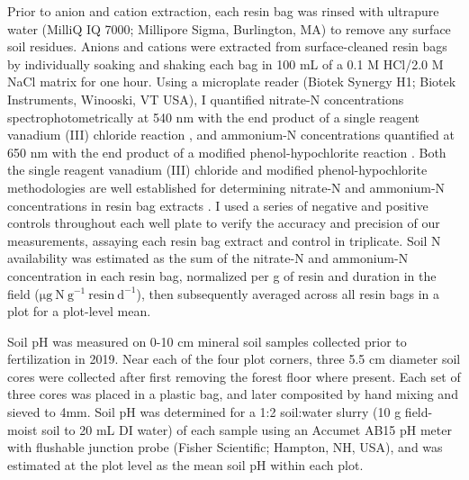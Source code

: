 Prior to anion and cation extraction, each resin bag was rinsed with ultrapure water (MilliQ IQ 7000; Millipore Sigma, Burlington, MA) to remove any surface soil residues. Anions and cations were extracted from surface-cleaned resin bags by individually soaking and shaking each bag in 100 mL of a 0.1 M HCl/2.0 M NaCl matrix for one hour. Using a microplate reader (Biotek Synergy H1; Biotek Instruments, Winooski, VT USA), I quantified nitrate-N concentrations spectrophotometrically at 540 nm with the end product of a single reagent vanadium (III) chloride reaction , and ammonium-N concentrations quantified at 650 nm with the end product of a modified phenol-hypochlorite reaction . Both the single reagent vanadium (III) chloride and modified phenol-hypochlorite methodologies are well established for determining nitrate-N and ammonium-N concentrations in resin bag extracts . I used a series of negative and positive controls throughout each well plate to verify the accuracy and precision of our measurements, assaying each resin bag extract and control in triplicate. Soil N availability was estimated as the sum of the nitrate-N and ammonium-N concentration in each resin bag, normalized per g of resin and duration in the field ($\mathrm{\mu g\ N\ g^{-1}\ resin\ d^{-1}}$), then subsequently averaged across all resin bags in a plot for a plot-level mean.
    
Soil pH was measured on 0-10 cm mineral soil samples collected prior to fertilization in 2019. Near each of the four plot corners, three 5.5 cm diameter soil cores were collected after first removing the forest floor where present. Each set of three cores was placed in a plastic bag, and later composited by hand mixing and sieved to 4mm. Soil pH was determined for a 1:2 soil:water slurry (10 g field-moist soil to 20 mL DI water) of each sample using an Accumet AB15 pH meter with flushable junction probe (Fisher Scientific; Hampton, NH, USA), and was estimated at the plot level as the mean soil pH within each plot.

